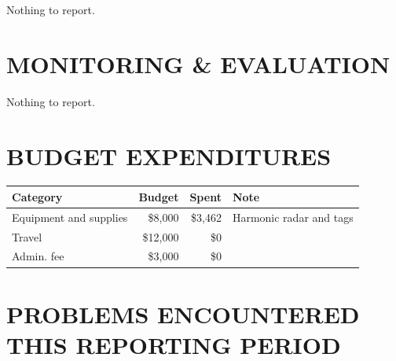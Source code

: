 \documentclass[12pt,letterpaper,english,bibliography=totocnumbered,abstract=on]{scrartcl}
\begin{document}
%
%
%
%
%
%

Nothing to report.

\section{MONITORING \& EVALUATION}

%

Nothing to report.

\section{BUDGET EXPENDITURES}


\begin{tabular}{lrrl}
	\hline
	Category & Budget & Spent & Note \\
	\hline 
	Equipment and supplies & \$8,000 & \$3,462 & Harmonic radar and tags \\ 
	Travel & \$12,000 & \$0 \\ 
	Admin. fee & \$3,000 & \$0 \\ 
	\hline 
\end{tabular} 

\section{PROBLEMS ENCOUNTERED THIS REPORTING PERIOD}
\label{impediments}

\end{document}
